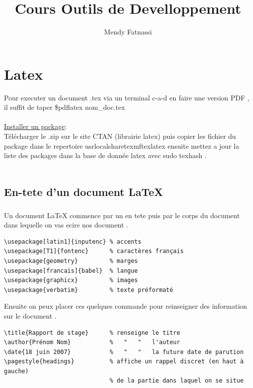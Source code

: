 \documentclass[a4paper,12pt,openany]{book}
\author{Mendy Fatnassi}
\title{Cours Outils de Develloppement}
\begin{document}
\maketitle
\tableofcontents

\chapter{Latex}
Pour executer un document .tex via un terminal c-a-d en faire une version PDF , il suffit de taper \$pdflatex nom\_doc.tex \\
\\
\underline{Installer un package}:\\
T\'el\'echarger le .zip sur le site CTAN (librairie latex) puis copier les fichier du package dans le repertoire \/usr\/local\/share\/texmf\/tex\/latex
ensuite mettez a jour la liste des packages dans la base de donnée latex avec sudo texhash .\\
\\

\section{En-tete d'un document LaTeX}

\paragraph{}
Un document LaTeX commence par un en tete puis par le corps du document dans lequelle on vas ecire nos document .\\

\begin{verbatim}
\usepackage[latin1]{inputenc} % accents
\usepackage[T1]{fontenc}      % caractères français
\usepackage{geometry}         % marges
\usepackage[francais]{babel}  % langue
\usepackage{graphicx}         % images
\usepackage{verbatim}         % texte préformaté
\end{verbatim}

Ensuite on peux placer ces quelques commande pour reinseigner des information sur le document .\\

\begin{verbatim}
\title{Rapport de stage}      % renseigne le titre
\author{Prénom Nom}           %   "   "   l'auteur
\date{18 juin 2007}           %   "   "   la future date de parution
\pagestyle{headings}          % affiche un rappel discret (en haut à gauche)
                              % de la partie dans laquel on se situe
\end{verbatim}
\end{document}
